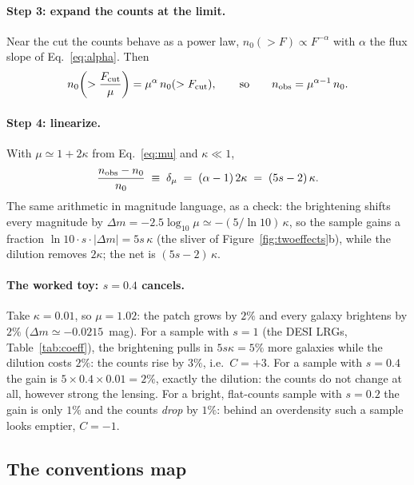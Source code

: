 \documentclass[11pt]{article}
\begin{document}
\paragraph{Step 3: expand the counts at the limit.}
Near the cut the counts behave as a power law,
$n_0(>F) \propto F^{-\alpha}$ with $\alpha$ the flux slope of
Eq.~\eqref{eq:alpha}.  Then
\begin{equation}
  n_0\!\left(> \frac{F_{\rm cut}}{\mu}\right)
  = \mu^{\alpha}\, n_0(>F_{\rm cut}),
  \qquad\text{so}\qquad
  n_{\rm obs} = \mu^{\alpha - 1}\, n_0 .
  \label{eq:mualpha}
\end{equation}

\paragraph{Step 4: linearize.}
With $\mu \simeq 1 + 2\kappa$ from Eq.~\eqref{eq:mu} and
$\kappa \ll 1$,
\begin{equation}
  \frac{n_{\rm obs} - n_0}{n_0}
  \;\equiv\; \delta_\mu
  \;=\; (\alpha - 1)\, 2\kappa
  \;=\; (5s - 2)\,\kappa .
  \label{eq:deltamu}
\end{equation}
The same arithmetic in magnitude language, as a check: the
brightening shifts every magnitude by
$\Delta m = -2.5\log_{10}\mu \simeq -(5/\ln 10)\,\kappa$, so the
sample gains a fraction
$\ln 10 \cdot s \cdot |\Delta m| = 5 s\,\kappa$ (the sliver of
Figure~\ref{fig:twoeffects}b), while the dilution removes $2\kappa$;
the net is $(5s - 2)\,\kappa$.

\paragraph{The worked toy: $s = 0.4$ cancels.}
Take $\kappa = 0.01$, so $\mu = 1.02$: the patch grows by $2\%$ and
every galaxy brightens by $2\%$ ($\Delta m \simeq -0.0215$~mag).  For
a sample with $s = 1$ (the DESI LRGs, Table~\ref{tab:coeff}), the
brightening pulls in $5 s \kappa = 5\%$ more galaxies while the
dilution costs $2\%$: the counts rise by $3\%$, i.e.\ $C = +3$.  For
a sample with $s = 0.4$ the gain is $5 \times 0.4 \times 0.01 = 2\%$,
exactly the dilution: the counts do not change at all, however strong
the lensing.  For a bright, flat-counts sample with $s = 0.2$ the
gain is only $1\%$ and the counts \emph{drop} by $1\%$: behind an
overdensity such a sample looks emptier, $C = -1$.

\subsection{The conventions map}
\label{sec:conventions}
\end{document}

